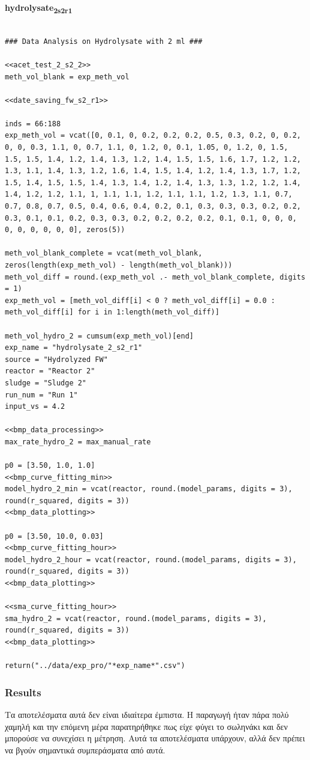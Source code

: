 \documentclass[11pt]{article}
\begin{document}
\textbf{hydrolysate\textsubscript{2}\textsubscript{s2}\textsubscript{r1}}
\begin{verbatim}

### Data Analysis on Hydrolysate with 2 ml ###

<<acet_test_2_s2_2>>
meth_vol_blank = exp_meth_vol

<<date_saving_fw_s2_r1>>

inds = 66:188
exp_meth_vol = vcat([0, 0.1, 0, 0.2, 0.2, 0.2, 0.5, 0.3, 0.2, 0, 0.2, 0, 0, 0.3, 1.1, 0, 0.7, 1.1, 0, 1.2, 0, 0.1, 1.05, 0, 1.2, 0, 1.5, 1.5, 1.5, 1.4, 1.2, 1.4, 1.3, 1.2, 1.4, 1.5, 1.5, 1.6, 1.7, 1.2, 1.2, 1.3, 1.1, 1.4, 1.3, 1.2, 1.6, 1.4, 1.5, 1.4, 1.2, 1.4, 1.3, 1.7, 1.2, 1.5, 1.4, 1.5, 1.5, 1.4, 1.3, 1.4, 1.2, 1.4, 1.3, 1.3, 1.2, 1.2, 1.4, 1.4, 1.2, 1.2, 1.1, 1, 1.1, 1.1, 1.2, 1.1, 1.1, 1.2, 1.3, 1.1, 0.7, 0.7, 0.8, 0.7, 0.5, 0.4, 0.6, 0.4, 0.2, 0.1, 0.3, 0.3, 0.3, 0.2, 0.2, 0.3, 0.1, 0.1, 0.2, 0.3, 0.3, 0.2, 0.2, 0.2, 0.2, 0.1, 0.1, 0, 0, 0, 0, 0, 0, 0, 0, 0], zeros(5))

meth_vol_blank_complete = vcat(meth_vol_blank, zeros(length(exp_meth_vol) - length(meth_vol_blank)))
meth_vol_diff = round.(exp_meth_vol .- meth_vol_blank_complete, digits = 1)
exp_meth_vol = [meth_vol_diff[i] < 0 ? meth_vol_diff[i] = 0.0 : meth_vol_diff[i] for i in 1:length(meth_vol_diff)]

meth_vol_hydro_2 = cumsum(exp_meth_vol)[end]
exp_name = "hydrolysate_2_s2_r1"
source = "Hydrolyzed FW"
reactor = "Reactor 2"
sludge = "Sludge 2"
run_num = "Run 1"
input_vs = 4.2

<<bmp_data_processing>>
max_rate_hydro_2 = max_manual_rate

p0 = [3.50, 1.0, 1.0]
<<bmp_curve_fitting_min>>
model_hydro_2_min = vcat(reactor, round.(model_params, digits = 3), round(r_squared, digits = 3))
<<bmp_data_plotting>>

p0 = [3.50, 10.0, 0.03]
<<bmp_curve_fitting_hour>>
model_hydro_2_hour = vcat(reactor, round.(model_params, digits = 3), round(r_squared, digits = 3))
<<bmp_data_plotting>>

<<sma_curve_fitting_hour>>
sma_hydro_2 = vcat(reactor, round.(model_params, digits = 3), round(r_squared, digits = 3))
<<bmp_data_plotting>>

return("../data/exp_pro/"*exp_name*".csv")
\end{verbatim}

\subsubsection{Results}
\label{sec:orgf34bd52}
Τα αποτελέσματα αυτά δεν είναι ιδιαίτερα έμπιστα. Η παραγωγή ήταν πάρα πολύ χαμηλή και την επόμενη μέρα παρατηρήθηκε πως είχε φύγει το σωληνάκι και δεν μπορούσε να συνεχίσει η μέτρηση. Αυτά τα αποτελέσματα υπάρχουν, αλλά δεν πρέπει να βγούν σημαντικά συμπεράσματα από αυτά.
\end{document}
